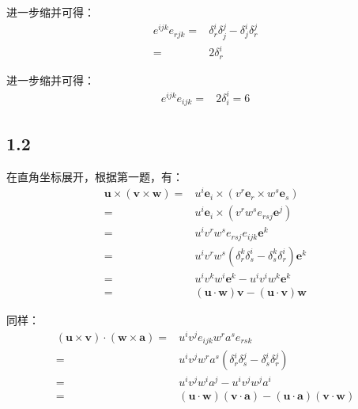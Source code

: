 \documentclass[UTF8,zihao=5]{ctexart}
\newcommand{\bm}[1]{{\mathbf{#1}}}
\begin{document}
进一步缩并可得：
\begin{equation*}
    \begin{aligned}
        e^{ijk}e_{rjk}
    =&\delta^i_r\delta^j_j -
    \delta^i_j\delta^j_r \\
    =&2\delta^i_r
    \end{aligned}
\end{equation*}

进一步缩并可得：
\begin{equation*}
    \begin{aligned}
        e^{ijk}e_{ijk}
    =&2\delta^i_i
    =6
    \end{aligned}
\end{equation*}

\subsection*{1.2}
在直角坐标展开，根据第一题，有：
\begin{equation*}
    \begin{aligned}
        \bm{u}\times(\bm{v}\times\bm{w})
        =&
        u^i\bm{e}_i\times(v^r\bm{e}_r\times w^s\bm{e}_s)\\
        =&
        u^i\bm{e}_i\times(v^r w^s e_{rsj}\bm{e}^j)\\
        =&
        u^i v^r w^s e_{rsj}e_{ijk}\bm{e}^k\\
        =&
        u^i v^r w^s (\delta^k_r\delta^i_s-\delta^k_s\delta^i_r)
        \bm{e}^k\\
        =&
        u^i v^k w^i \bm{e}^k- u^i v^i w^k\bm{e}^k\\
        =&
        (\bm{u}\cdot\bm{w})\bm{v}-(\bm{u}\cdot\bm{v})\bm{w}
    \end{aligned}
\end{equation*}

同样：
\begin{equation*}
    \begin{aligned}
        (\bm{u}\times\bm{v})\cdot(\bm{w}\times\bm{a})
        =&
        u^iv^je_{ijk}w^ra^se_{rsk}\\
        =&
        u^iv^jw^ra^s(\delta^i_r\delta^j_s -
        \delta^i_s\delta^j_r)\\
        =&
        u^iv^jw^ia^j-u^iv^jw^ja^i\\
        =&
        (\bm{u}\cdot\bm{w})(\bm{v}\cdot\bm{a})-
        (\bm{u}\cdot\bm{a})(\bm{v}\cdot\bm{w})
    \end{aligned}
\end{equation*}
\end{document}
